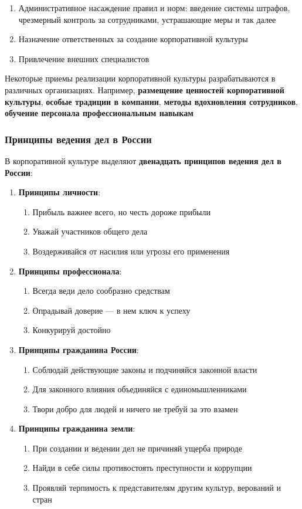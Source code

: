 \documentclass{article}
\begin{document}
\begin{enumerate}
    \item Административное насаждение правил и норм: введение системы штрафов, чрезмерный контроль за сотрудниками, устрашающие меры и так далее
    \item Назначение ответственных за создание корпоративной культуры
    \item Привлечение внешних специалистов
\end{enumerate}

Некоторые приемы реализации корпоративной культуры разрабатываются в различных организациях. Например, \textbf{размещение ценностей корпоративной культуры}, \textbf{особые традиции в компании}, \textbf{методы вдохновления сотрудников}, \textbf{обучение персонала профессиональным навыкам}

\subsubsection{Принципы ведения дел в России}

В корпоративной культуре выделяют \textbf{двенадцать принципов ведения дел в России}:

\begin{enumerate}
    \item \textbf{Принципы личности}:
    \begin{enumerate}
        \item Прибыль важнее всего, но честь дороже прибыли
        \item Уважай участников общего дела
        \item Воздерживайся от насилия или угрозы его применения
    \end{enumerate}
    \item \textbf{Принципы профессионала}:
    \begin{enumerate}
        \item Всегда веди дело сообразно средствам
        \item Опрадывай доверие — в нем ключ к успеху
        \item Конкурируй достойно
    \end{enumerate}
    \item \textbf{Принципы гражданина России}:
    \begin{enumerate}
        \item Соблюдай действующие законы и подчиняйся законной власти
        \item Для законного влияния объединяйся с единомышленниками
        \item Твори добро для людей и ничего не требуй за это взамен
    \end{enumerate}
    \item \textbf{Принципы гражданина земли}:
    \begin{enumerate}
        \item При создании и ведении дел не причиняй ущерба природе
        \item Найди в себе силы противостоять преступности и коррупции
        \item Проявляй терпимость к представителям другим культур, верований и стран
    \end{enumerate}
\end{enumerate}
\end{document}
